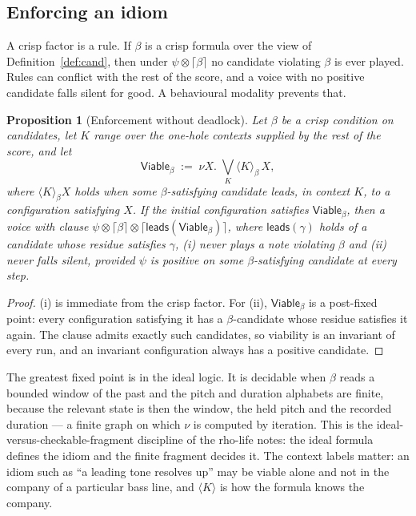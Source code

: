 \documentclass[11pt,a4paper]{article}
\theoremstyle{plain}
\newtheorem{proposition}[theorem]{Proposition}
\theoremstyle{definition}
\theoremstyle{remark}
\newcommand{\tensorv}{\otimes}
\newcommand{\crisp}[1]{\lceil #1 \rceil}
\newcommand{\atm}[1]{\mathsf{#1}}
\begin{document}
\subsection{Enforcing an idiom}

A crisp factor is a rule. If $\beta$ is a crisp formula over the view of
Definition~\ref{def:cand}, then under $\psi\tensorv\crisp{\beta}$ no candidate
violating $\beta$ is ever played. Rules can conflict with the rest of the score,
and a voice with no positive candidate falls silent for good. A behavioural
modality prevents that.

\begin{proposition}[Enforcement without deadlock]\label{prop:enforce}
Let $\beta$ be a crisp condition on candidates, let $K$ range over the one-hole
contexts supplied by the rest of the score, and let
\[
\mathsf{Viable}_\beta \;:=\; \nu X.\;\bigvee_{K}\langle K\rangle_\beta\, X,
\]
where $\langle K\rangle_\beta X$ holds when some $\beta$-satisfying candidate
leads, in context $K$, to a configuration satisfying $X$. If the initial
configuration satisfies $\mathsf{Viable}_\beta$, then a voice with clause
$\psi\tensorv\crisp{\beta}\tensorv\crisp{\atm{leads}(\mathsf{Viable}_\beta)}$,
where $\atm{leads}(\gamma)$ holds of a candidate whose residue satisfies
$\gamma$, (i) never plays a note violating $\beta$ and (ii) never falls silent,
provided $\psi$ is positive on some $\beta$-satisfying candidate at every step.
\end{proposition}
\begin{proof}
(i) is immediate from the crisp factor. For (ii), $\mathsf{Viable}_\beta$ is a
post-fixed point: every configuration satisfying it has a $\beta$-candidate
whose residue satisfies it again. The clause admits exactly such candidates, so
viability is an invariant of every run, and an invariant configuration always
has a positive candidate.
\end{proof}

The greatest fixed point is in the ideal logic. It is decidable when $\beta$
reads a bounded window of the past and the pitch and duration alphabets are
finite, because the relevant state is then the window, the held pitch and the
recorded duration --- a finite graph on which $\nu$ is computed by iteration.
This is the ideal-versus-checkable-fragment discipline of the rho-life notes:
the ideal formula defines the idiom and the finite fragment decides it. The
context labels matter: an idiom such as ``a leading tone resolves up'' may be
viable alone and not in the company of a particular bass line, and
$\langle K\rangle$ is how the formula knows the company.
\end{document}
